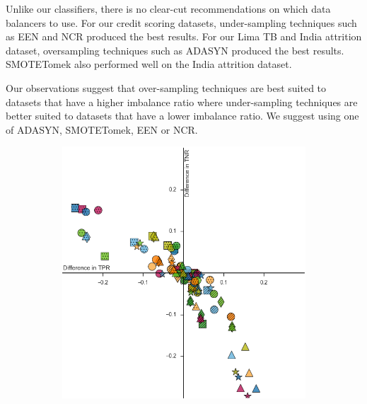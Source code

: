 \documentclass{sig-alternate-05-2015}
\begin{document}
	Unlike our classifiers, there is no clear-cut recommendations on which data balancers to use. For our credit scoring datasets, under-sampling techniques such as EEN and NCR produced the best results. For our Lima TB and India attrition dataset, oversampling techniques such as ADASYN produced the best results. SMOTETomek also performed well on the India attrition dataset.
	
	Our observations suggest that over-sampling techniques are best suited to datasets that have a higher imbalance ratio where under-sampling techniques are better suited to datasets that have a lower imbalance ratio. We suggest using one of ADASYN, SMOTETomek, EEN or NCR.
	
	\begin{figure}
		
		\centering
		\vspace*{-1.5cm}\hspace*{-1.5cm}\begin{subfigure}{.5\textwidth}
			\includegraphics[scale=0.61]{classifier_dataset_plt_2016-11-01_10-20-21}
		\end{subfigure}\hspace*{4cm}\vspace*{-0.5cm}%
		\hspace*{-2cm}\begin{subfigure}{.5\textwidth}

\end{subfigure}
\end{figure}
\end{document}

